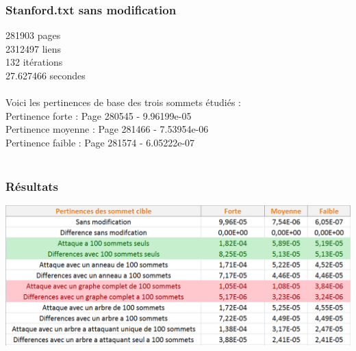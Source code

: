 \documentclass[a4paper,11pt]{article}
\begin{document}
		\subsubsection{Stanford.txt sans modification}
			281903 pages\\
			2312497 liens\\
			132 itérations\\
			27.627466 secondes\\
			\\
			Voici les pertinences de base des trois sommets étudiés :\\
			Pertinence forte : Page 280545 - 9.96199e-05\\
			Pertinence moyenne : Page 281466 - 7.53954e-06\\
			Pertinence faible : Page 281574 - 6.05222e-07\\
			\\
		\subsubsection{Résultats}
			\includegraphics[scale = 0.5]{Captures/ranking1.PNG}
\end{document}
